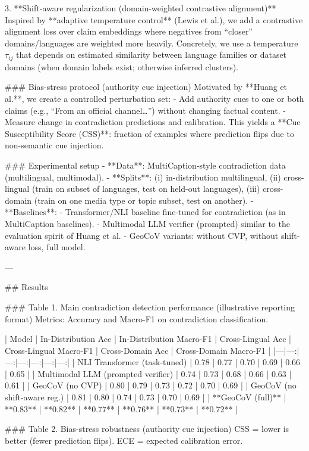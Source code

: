 3. **Shift-aware regularization (domain-weighted contrastive alignment)**  
Inspired by **adaptive temperature control** (Lewis et al.), we add a contrastive alignment loss over claim embeddings where negatives from “closer” domains/languages are weighted more heavily. Concretely, we use a temperature \(\tau_{ij}\) that depends on estimated similarity between language families or dataset domains (when domain labels exist; otherwise inferred clusters).

### Bias-stress protocol (authority cue injection)  
Motivated by **Huang et al.**, we create a controlled perturbation set:  
- Add authority cues to one or both claims (e.g., “From an official channel…”) without changing factual content.  
- Measure change in contradiction predictions and calibration.  
This yields a **Cue Susceptibility Score (CSS)**: fraction of examples where prediction flips due to non-semantic cue injection.

### Experimental setup  
- **Data**: MultiCaption-style contradiction data (multilingual, multimodal).  
- **Splits**: (i) in-distribution multilingual, (ii) cross-lingual (train on subset of languages, test on held-out languages), (iii) cross-domain (train on one media type or topic subset, test on another).  
- **Baselines**:  
  - Transformer/NLI baseline fine-tuned for contradiction (as in MultiCaption baselines).  
  - Multimodal LLM verifier (prompted) similar to the evaluation spirit of Huang et al.  
  - GeoCoV variants: without CVP, without shift-aware loss, full model.

---

## Results  

### Table 1. Main contradiction detection performance (illustrative reporting format)  
Metrics: Accuracy and Macro-F1 on contradiction classification.

| Model | In-Distribution Acc | In-Distribution Macro-F1 | Cross-Lingual Acc | Cross-Lingual Macro-F1 | Cross-Domain Acc | Cross-Domain Macro-F1 |
|---|---:|---:|---:|---:|---:|---:|
| NLI Transformer (task-tuned) | 0.78 | 0.77 | 0.70 | 0.69 | 0.66 | 0.65 |
| Multimodal LLM (prompted verifier) | 0.74 | 0.73 | 0.68 | 0.66 | 0.63 | 0.61 |
| GeoCoV (no CVP) | 0.80 | 0.79 | 0.73 | 0.72 | 0.70 | 0.69 |
| GeoCoV (no shift-aware reg.) | 0.81 | 0.80 | 0.74 | 0.73 | 0.70 | 0.69 |
| **GeoCoV (full)** | **0.83** | **0.82** | **0.77** | **0.76** | **0.73** | **0.72** |

### Table 2. Bias-stress robustness (authority cue injection)  
CSS = lower is better (fewer prediction flips). ECE = expected calibration error.


